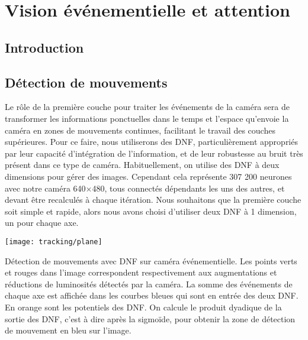 
\chapter{Vision événementielle et attention}
	\minitoc
	\newpage




	\section{Introduction}
	\section{Détection de mouvements}

	Le rôle de la première couche pour traiter les événements de la caméra sera de transformer les informations ponctuelles dans le temps et l'espace qu'envoie la caméra en zones de mouvements continues, facilitant le travail des couches supérieures. Pour ce faire, nous utiliserons des DNF, particulièrement appropriés par leur capacité d'intégration de l'information, et de leur robustesse au bruit très présent dans ce type de caméra. Habituellement, on utilise des DNF à deux dimensions pour gérer des images. Cependant cela représente 307 200 neurones avec notre caméra 640$\times$480, tous connectés dépendants les uns des autres, et devant être recalculés à chaque itération. Nous souhaitons que la première couche soit simple et rapide, alors nous avons choisi d'utiliser deux DNF à 1 dimension, un pour chaque axe.



	\begin{figureth}
		\begin{subfigureth}{\textwidth}
			\texttt{[image: tracking/plane]}
		\end{subfigureth}
		\caption[Détection de mouvements avec DNF sur caméra événementielle]{Détection de mouvements avec DNF sur caméra événementielle. Les points verts et rouges dans l'image correspondent respectivement aux augmentations et réductions de luminosités détectés par la caméra. La somme des événements de chaque axe est affichée dans les courbes bleues qui sont en entrée des deux DNF. En orange sont les potentiels des DNF. On calcule le produit dyadique de la sortie des DNF, c'est à dire après la sigmoïde, pour obtenir la zone de détection de mouvement en bleu sur l'image.}\label{fig:track:plane}
	\end{figureth}

